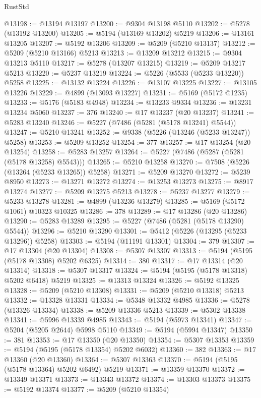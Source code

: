\begin{lexlean}{RustStd}
\begin{coremodule}
@13198 := @13194 @13197
@13200 := @9304 @13198 @5110
@13202 := @5278 (@13192 @13200)
@13205 := @5194 (@13169 @13202) @5219
@13206 := @13161 @13205
@13207 := @5192 @13206
@13209 := @5209 (@5210 @13137)
@13212 := @5209 (@5210 @13166) @5213
@13213 := @13209 @13212
@13215 := @9304 @13213 @5110
@13217 := @5278 (@13207 @13215)
@13219 := @5209 @13217 @5213
@13220 := @5237 @13219
@13224 := @5226 (@5533 (@5233 @13220)) @5258
@13225 := @13132 @13224
@13226 := @13107 @13225
@13227 := @13105 @13226
@13229 := @4899 (@13093 @13227)
@13231 := @5169 (@5172 @1235)
@13233 := @5176 (@5183 @4948)
@13234 := @13233 @9334
@13236 := @13231 @13234 @5060
@13237 := 376
@13240 := @17 @13237 (@20 @13237)
@13241 := @5283 @13240
@13246 := @5227 (@7486 (@5281 (@5178 @13241) @5544))
@13247 := @5210 @13241
@13252 := @9338 (@5226 (@13246 (@5233 @13247)) @5258)
@13253 := @5209 @13252
@13254 := 377
@13257 := @17 @13254 (@20 @13254)
@13258 := @5283 @13257
@13264 := @5227 (@7486 (@5287 (@5281 (@5178 @13258) @5543)))
@13265 := @5210 @13258
@13270 := @7508 (@5226 (@13264 (@5233 @13265)) @5258)
@13271 := @5209 @13270
@13272 := @5239 @8950
@13273 := @13271 @13272
@13274 := @13253 @13273
@13275 := @8917 @13274
@13277 := @5209 @13275 @5213
@13278 := @5237 @13277
@13279 := @5233 @13278
@13281 := @4899 (@13236 @13279)
@13285 := @5169 (@5172 @1061) @10323 @10325
@13286 := 378
@13289 := @17 @13286 (@20 @13286)
@13290 := @5283 @13289
@13295 := @5227 (@7486 (@5281 (@5178 @13290) @5544))
@13296 := @5210 @13290
@13301 := @5412 (@5226 (@13295 (@5233 @13296)) @5258)
@13303 := @5194 (@11191 @13301)
@13304 := 379
@13307 := @17 @13304 (@20 @13304)
@13308 := @5307 @13307
@13313 := @5194 (@5195 (@5178 @13308) @5202 @6325)
@13314 := 380
@13317 := @17 @13314 (@20 @13314)
@13318 := @5307 @13317
@13324 := @5194 (@5195 (@5178 @13318) @5202 @6418) @5219
@13325 := @13313 @13324
@13326 := @5192 @13325
@13328 := @5209 (@5210 @13308)
@13331 := @5209 (@5210 @13318) @5213
@13332 := @13328 @13331
@13334 := @5348 @13332 @4985
@13336 := @5278 (@13326 @13334)
@13338 := @5209 @13336 @5213
@13339 := @5302 @13338
@13341 := @5996 @13339 @4985
@13343 := @5194 (@5973 @13341)
@13347 := @5204 (@5205 @2644) @5998 @5110
@13349 := @5194 (@5994 @13347)
@13350 := 381
@13353 := @17 @13350 (@20 @13350)
@13354 := @5307 @13353
@13359 := @5194 (@5195 (@5178 @13354) @5202 @6032)
@13360 := 382
@13363 := @17 @13360 (@20 @13360)
@13364 := @5307 @13363
@13370 := @5194 (@5195 (@5178 @13364) @5202 @6492) @5219
@13371 := @13359 @13370
@13372 := @13349 @13371
@13373 := @13343 @13372
@13374 := @13303 @13373
@13375 := @5192 @13374
@13377 := @5209 (@5210 @13354)

\end{coremodule}
\end{lexlean}
